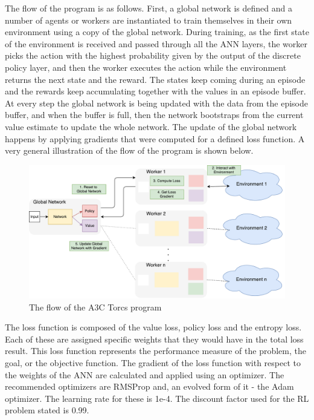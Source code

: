 The flow of the program is as follows. First, a global network is defined and a number of agents or workers are instantiated to train themselves in their own environment using a copy of the global network. During training, as the first state of the environment is received and passed through all the ANN layers, the worker picks the action with the highest probability given by the output of the discrete policy layer, and then the worker executes the action while the environment returns the next state and the reward. The states keep coming during an episode and the rewards keep accumulating together with the values in an episode buffer. At every step the global network is being updated with the data from the episode buffer, and when the buffer is full, then the network bootstraps from the current value estimate to update the whole network. The update of the global network happens by applying gradients that were computed for a defined loss function. A very general illustration of the flow of the program is shown below.
\begin{figure}[H]
	\centering
	\includegraphics[width=1.25\textwidth]{Figures/Flow}
	\caption{The flow of the A3C Torcs program}
	\label{Flow}
\end{figure}
The loss function is composed of the value loss, policy loss and the entropy loss. Each of these are assigned specific weights that they would have in the total loss result. This loss function represents the performance measure of the problem, the goal, or the objective function. The gradient of the loss function with respect to the weights of the ANN are calculated and applied using an optimizer. The recommended optimizers are RMSProp and, an evolved form of it - the Adam optimizer. The learning rate for these is 1e-4. The discount factor used for the RL problem stated is 0.99.